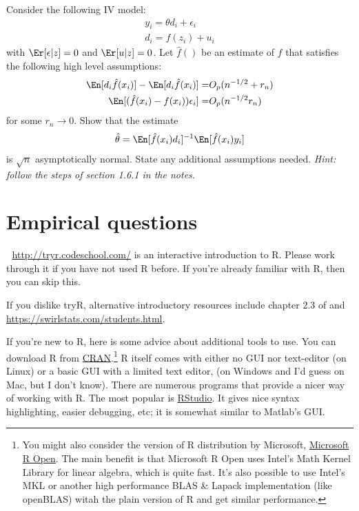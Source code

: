 \begin{problem}
  Consider the following IV model:
  \begin{align*}
    y_i = \theta d_i + \epsilon_i \\
    d_i = f(z_i) + u_i
  \end{align*}
  with $\Er[\epsilon|z] = 0$ and $\Er[u|z] = 0$. Let $\hat{f}()$ be an
  estimate of $f$ that satisfies the following high level assumptions:
  \begin{align}
    \En[d_i \hat{f}(x_i)] - \En[d_i \hat{f}(x_i)] = & O_p(n^{-1/2} +
                                                      r_n) \label{r1} \\
    \En[(\hat{f}(x_i) - f(x_i)) \epsilon_i] = & O_p(n^{-1/2} r_n) \label{r1}
  \end{align}
  for some $r_n \to 0$. Show that the estimate
  \begin{align*}
    \hat{\theta} = \En[\hat{f}(x_i) d_i]^{-1} \En[\hat{f}(x_i) y_i ]
  \end{align*}
  is $\sqrt{n}$ asymptotically normal. State any additional
  assumptions needed. {\slshape{Hint: follow the steps of section
      1.6.1 in the notes}.}
\end{problem}

\section{Empirical questions}

\begin{problem} $\;$
  \url{http://tryr.codeschool.com/} is an interactive introduction to
  R. Please work through it if you have not used R before. If you're
  already familiar with R, then you can skip this.

  If you dislike tryR, alternative introductory resources include
  chapter 2.3 of \cite{james2013} and \href{Swirl}
  {https://swirlstats.com/students.html}.   
\end{problem}

If you're new to R, here is some advice about additional tools to
use. You can download R from
\href{https://cran.r-project.org/}{CRAN}.\footnote{You might also consider the
version of R distribution by Microsoft,
\href{https://mran.microsoft.com/rro}{Microsoft R Open}. The main
benefit is that Microsoft R Open uses Intel's Math Kernel Library for
linear algebra, which is quite fast. It's also possible to use Intel's
MKL or another high performance BLAS \& Lapack implementation (like
openBLAS) witah the plain version of R and get similar
performance.}
R itself comes with either no GUI nor text-editor (on Linux) or a
basic GUI with a limited text editor, (on Windows and I'd guess on
Mac, but I don't know). There are numerous programs that provide a
nicer way of working with R. The most popular is
\href{https://www.rstudio.com/} {RStudio}. It gives nice syntax
highlighting, easier debugging, etc; it is somewhat similar to
Matlab's GUI.  

